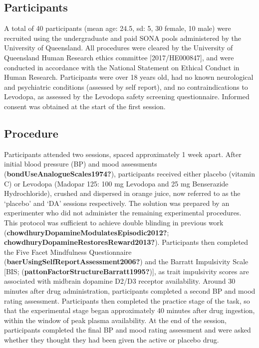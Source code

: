 \documentclass{article}
\begin{document}
\label{sec:Methods}

\hypertarget{participants}{%
\subsection{Participants}\label{participants}}

A total of 40 participants (mean age: 24.5, sd: 5, 30 female, 10 male)
were recruited using the undergraduate and paid SONA pools administered
by the University of Queensland. All procedures were cleared by the
University of Queensland Human Research ethics committee
{[}2017/HE000847{]}, and were conducted in accordance with the National
Statement on Ethical Conduct in Human Research. Participants were over
18 years old, had no known neurological and psychiatric conditions
(assessed by self report), and no contraindications to Levodopa, as
assessed by the Levodopa safety screening questionnaire. Informed
consent was obtained at the start of the first session.

\hypertarget{procedure}{%
\subsection{Procedure}\label{procedure}}

Participants attended two sessions, spaced approximately 1 week apart.
After initial blood pressure (BP) and mood assessments
(\textbf{bondUseAnalogueScales1974?}), participants received either
placebo (vitamin C) or Levodopa (Madopar 125: 100 mg Levodopa and 25 mg
Benserazide Hydrochloride), crushed and dispersed in orange juice, now
referred to as the `placebo' and `DA' sessions respectively. The
solution was prepared by an experimenter who did not administer the
remaining experimental procedures. This protocol was sufficient to
achieve double blinding in previous work
(\textbf{chowdhuryDopamineModulatesEpisodic2012?};
\textbf{chowdhuryDopamineRestoresReward2013?}). Participants then
completed the Five Facet Mindfulness Questionnaire
(\textbf{baerUsingSelfReportAssessment2006?}) and the Barratt
Impulsivity Scale {[}BIS;
(\textbf{pattonFactorStructureBarratt1995?}){]}, as trait impulsivity
scores are associated with midbrain dopamine D2/D3 receptor
availability. Around 30 minutes after drug administration, participants
completed a second BP and mood rating assessment. Participants then
completed the practice stage of the task, so that the experimental stage
began approximately 40 minutes after drug ingestion, within the window
of peak plasma availability. At the end of the session, participants
completed the final BP and mood rating assessment and were asked whether
they thought they had been given the active or placebo drug.
\end{document}
